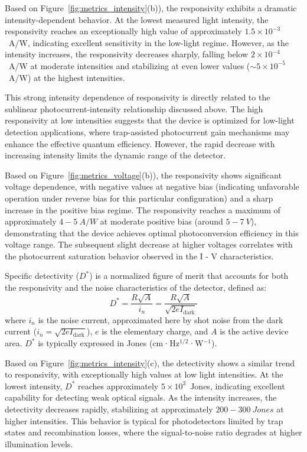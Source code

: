 \documentclass{rapportCS}
\begin{document}
	Based on Figure~\ref{fig:metrics_intensity}(b)), the responsivity exhibits a dramatic intensity-dependent behavior. At the lowest measured light intensity, the responsivity reaches an exceptionally high value of approximately $1.5 \times 10^{-3}$~A/W, indicating excellent sensitivity in the low-light regime. However, as the intensity increases, the responsivity decreases sharply, falling below $2 \times 10^{-4}$~A/W at moderate intensities and stabilizing at even lower values ($\sim 5 \times 10^{-5}$~A/W) at the highest intensities.
	
	This strong intensity dependence of responsivity is directly related to the sublinear photocurrent-intensity relationship discussed above. The high responsivity at low intensities suggests that the device is optimized for low-light detection applications, where trap-assisted photocurrent gain mechanisms may enhance the effective quantum efficiency. However, the rapid decrease with increasing intensity limits the dynamic range of the detector.
	
	
	Based on Figure~\ref{fig:metrics_voltage}(b)), the responsivity shows significant voltage dependence, with negative values at negative bias (indicating unfavorable operation under reverse bias for this particular configuration) and a sharp increase in the positive bias regime. The responsivity reaches a maximum of approximately $4 - 5~A/W$ at moderate positive bias (around $5 - 7~V$), demonstrating that the device achieves optimal photoconversion efficiency in this voltage range. The subsequent slight decrease at higher voltages correlates with the photocurrent saturation behavior observed in the I - V characteristics.
	
	Specific detectivity ($D^{\ast}$) is a normalized figure of merit that accounts for both the responsivity and the noise characteristics of the detector, defined as:
	\begin{equation}
		D^* = \frac{R \sqrt{A}}{i_n} = \frac{R \sqrt{A}}{\sqrt{2eI_{\text{dark}}}}
	\end{equation}
	where $i_n$ is the noise current, approximated here by shot noise from the dark current ($i_n = \sqrt{2eI_{\text{dark}}}$), $e$ is the elementary charge, and $A$ is the active device area. $D^*$ is typically expressed in Jones (cm·Hz$^{1/2}$·W$^{-1}$).
	
	Based on Figure~\ref{fig:metrics_intensity}(c), the detectivity shows a similar trend to responsivity, with exceptionally high values at low light intensities. At the lowest intensity, $D^*$ reaches approximately $5 \times 10^3$~Jones, indicating excellent capability for detecting weak optical signals. As the intensity increases, the detectivity decreases rapidly, stabilizing at approximately $200 - 300~Jones$ at higher intensities. This behavior is typical for photodetectors limited by trap states and recombination losses, where the signal-to-noise ratio degrades at higher illumination levels.
	
\end{document}
